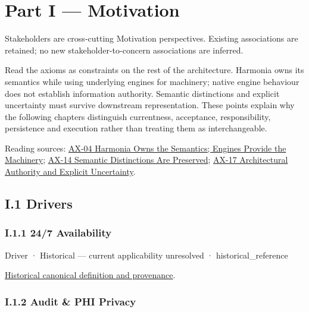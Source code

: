 \part*{Part I — Motivation}
\label{navigation:I}
Stakeholders are cross-cutting Motivation perspectives. Existing associations are retained; no new stakeholder-to-concern associations are inferred.\par
Read the axioms as constraints on the rest of the architecture. Harmonia owns its semantics while using underlying engines for machinery; native engine behaviour does not establish information authority. Semantic distinctions and explicit uncertainty must survive downstream representation. These points explain why the following chapters distinguish currentness, acceptance, responsibility, persistence and execution rather than treating them as interchangeable.

{\small Reading sources: \hyperref[element:54508cda80484a6caf95b901780eaf7d]{AX-04 Harmonia Owns the Semantics; Engines Provide the Machinery}; \hyperref[element:d3fc6025dc7646d1b2020b51f7a44bfa]{AX-14 Semantic Distinctions Are Preserved}; \hyperref[element:8882573df7ce43c6bc0f66da0a676139]{AX-17 Architectural Authority and Explicit Uncertainty}.}\par
\chapter*{I.1 Drivers}
\label{navigation:I.1}

\section*{I.1.1 24/7 Availability}
\label{navigation:I.1.1}

\label{element:782f53e2190f4a8a8d0dc0a33cd6fbb3}
{\small Driver · Historical — current applicability unresolved · historical\_reference}\par
\href{../../../../continuum/motivation/driver/782f53e2190f4a8a8d0dc0a33cd6fbb3.md}{Historical canonical definition and provenance}.\par
\section*{I.1.2 Audit \& PHI Privacy}
\label{navigation:I.1.2}

